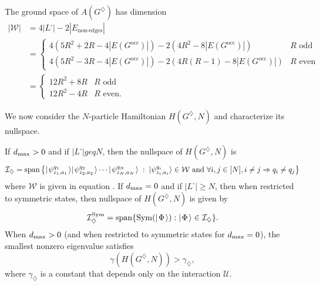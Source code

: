 \documentclass[../thesis-main/thesis-main]{subfiles}
\begin{document}
The ground space of $A(G^{\diamondsuit})$ has dimension 
\begin{align}
|\mathcal{W}|&=4\big|L^{\square}\big|  -2\left|E_{\text{non-edges}}\right|\\
&=\begin{cases}
4\left(5R^{2}+2R-4|E(G^{\text{occ}})|\right)-2\left(4R^{2}-8|E(G^{\text{occ}})|\right) & R\text{ odd}\\
4\left(5R^{2}-3R-4|E(G^{\text{occ}})|\right)-2\left(4R(R-1)-8|E(G^{\text{occ}})|\right) & R\text{ even}
\end{cases} \\
&= \begin{cases}
12R^{2}+8R & R\text{ odd}\\
12R^{2}-4R & R\text{ even}.
\end{cases}\label{eq:num_basis_W}
\end{align}

We now consider the $N$-particle Hamiltonian $H(G^{\diamondsuit},N)$ and characterize its nullspace.

\begin{lemma}
\label{lem:The-nullspace-of_Hdiamond} If $d_{\text{max}} >0$ and if $|L^\square| geq N$, then the nullspace of $H(G^{\diamondsuit},N)$ is 
\begin{equation}
  \mathcal{I}_{\diamondsuit}= \operatorname{span} \big\{ |\mspace{2mu} \psi_{z_1,a_1}^{q_1} \mspace{2mu} \rangle |\mspace{2mu} \psi_{z_2,a_2}^{q_2} \mspace{2mu} \rangle \cdots |\mspace{2mu} \psi_{z_N,a_N}^{q_N} \mspace{2mu} \rangle\; : \; |\psi_{z_{i},a_{i}}^{q_{i}}\rangle\in\mathcal{W}\text{ and } \forall i,j\in [N], i\neq j \Rightarrow q_{i}\neq q_{j} \big\}
\end{equation}
where $\mathcal{W}$ is given in equation .  If $d_{\text{max}} = 0$ and if $|L^\square|\geq N$, then when restricted to symmetric states, then nullspace of $H(G^{\diamondsuit},N)$ is given by
\begin{equation}
  \mathcal{I}_{\diamondsuit}^{\operatorname{Sym}}=\operatorname{span}\{ \operatorname{Sym}( |\mspace{2mu} \Phi \mspace{2mu} \rangle) : |\mspace{2mu} \Phi \mspace{2mu} \rangle \in \mathcal{I}_{\diamondsuit}\}.
\end{equation} 
When $d_{\text{max}} >0$ (and when restricted to symmetric states for $d_{\text{max}} = 0$), the smallest nonzero eigenvalue satisfies 
\begin{equation}
  \gamma(H(G^{\diamondsuit},N)) > \gamma_{\diamondsuit},
\end{equation}
where $\gamma_{\diamondsuit}$ is a constant that depends only on the interaction $\mathcal{U}$.
\end{lemma}
\end{document}
